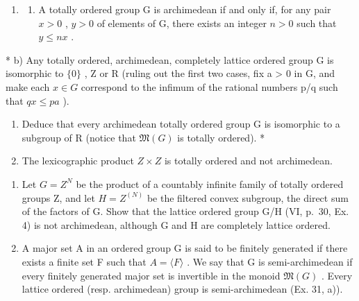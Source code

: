 \begin{enumerate}
\def\labelenumi{\arabic{enumi})}
\setcounter{enumi}{32}
\tightlist
\item
  \begin{enumerate}
  \def\labelenumii{\alph{enumii})}
  \tightlist
  \item
    A totally ordered group G is archimedean if and only if, for any pair \(x > 0\) , \(y > 0\) of elements of G, there exists an integer \(n > 0\) such that \(y \leqslant nx\) .
  \end{enumerate}
\end{enumerate}

* b) Any totally ordered, archimedean, completely lattice ordered group G is isomorphic to \(\{0\}\) , Z or R (ruling out the first two cases, fix a \textgreater{} 0 in G, and make each \(x \in G\) correspond to the infimum of the rational numbers p/q such that \(qx \leq pa\) ).

\begin{enumerate}
\def\labelenumi{\alph{enumi})}
\setcounter{enumi}{2}
\item
  Deduce that every archimedean totally ordered group G is isomorphic to a subgroup of R (notice that \(\mathfrak{M}(G)\) is totally ordered). *
\item
  The lexicographic product \(Z \times Z\) is totally ordered and not archimedean.
\end{enumerate}

\begin{enumerate}
\def\labelenumi{\arabic{enumi})}
\setcounter{enumi}{33}
\item
  Let \(G = Z^{N}\) be the product of a countably infinite family of totally ordered groups Z, and let \(H = Z^{(N)}\) be the filtered convex subgroup, the direct sum of the factors of G. Show that the lattice ordered group G/H (VI, p.~30, Ex. 4) is not archimedean, although G and H are completely lattice ordered.
\item
  A major set A in an ordered group G is said to be finitely generated if there exists a finite set F such that \(A = \langle F \rangle\) . We say that G is semi-archimedean if every finitely generated major set is invertible in the monoid \(\mathfrak{M}(G)\) . Every lattice ordered (resp. archimedean) group is semi-archimedean (Ex. 31, a)).
\end{enumerate}

